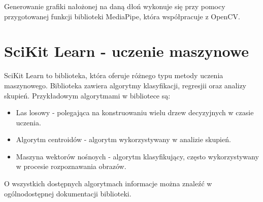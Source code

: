 \quad Generowanie grafiki nałożonej na daną dłoń wykonuje się przy pomocy przygotowanej funkcji biblioteki MediaPipe, która współpracuje z OpenCV. 



\section{SciKit Learn - uczenie maszynowe}

\quad SciKit Learn to biblioteka, która oferuje różnego typu metody uczenia maszynowego. Biblioteka zawiera algorytmy klasyfikacji, regresjii oraz analizy skupień. Przykładowym algorytmami w bibliotece są:

\begin{itemize}
    \item Las losowy - polegająca na konstruowaniu wielu drzew decyzyjnych w czasie uczenia. 
    \item Algorytm centroidów - algorytm wykorzystywany w analizie skupień.
    \item Maszyna wektorów nośnoych - algorytm klasyfikujący, często wykorzystywany w procesie rozpoznawania obrazów. 
\end{itemize}

O wszystkich dostępnych algorytmach informacje można znaleźć w ogólnodostępnej dokumentacji biblioteki. 
